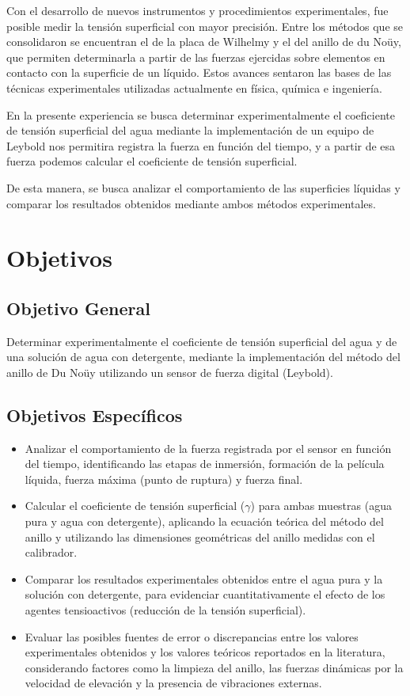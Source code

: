 \documentclass[11pt,a4paper]{article}
\begin{document}
Con el desarrollo de nuevos instrumentos y procedimientos experimentales, 
fue posible medir la tensión superficial con mayor precisión. Entre los 
métodos que se consolidaron se encuentran el de la placa de Wilhelmy y 
el del anillo de du Noüy, que permiten determinarla a partir de las 
fuerzas ejercidas sobre elementos en contacto con la superficie de un 
líquido. Estos avances sentaron las bases de las técnicas experimentales 
utilizadas actualmente en física, química e ingeniería.

En la presente experiencia se busca determinar
experimentalmente el coeficiente de tensión superficial
del agua mediante la implementación de un equipo de Leybold
nos permitira registra la fuerza en función del tiempo, 
y a partir de esa fuerza podemos calcular el coeficiente 
de tensión superficial.

De esta manera, se busca analizar el comportamiento
de las superficies líquidas y comparar los resultados
obtenidos mediante ambos métodos experimentales.

\newpage
\section{Objetivos}

\subsection*{Objetivo General}
Determinar experimentalmente el coeficiente de tensión superficial del agua y de una solución de agua con detergente, mediante la implementación del método del anillo de Du Noüy utilizando un sensor de fuerza digital (Leybold).

\subsection*{Objetivos Específicos}
\begin{itemize}
    \item Analizar el comportamiento de la fuerza registrada por el sensor en función del tiempo, identificando las etapas de inmersión, formación de la película líquida, fuerza máxima (punto de ruptura) y fuerza final.
    \item Calcular el coeficiente de tensión superficial (\(\gamma\)) para ambas muestras (agua pura y agua con detergente), aplicando la ecuación teórica del método del anillo y utilizando las dimensiones geométricas del anillo medidas con el calibrador.
    \item Comparar los resultados experimentales obtenidos entre el agua pura y la solución con detergente, para evidenciar cuantitativamente el efecto de los agentes tensioactivos (reducción de la tensión superficial).
    \item Evaluar las posibles fuentes de error o discrepancias entre los valores experimentales obtenidos y los valores teóricos reportados en la literatura, considerando factores como la limpieza del anillo, las fuerzas dinámicas por la velocidad de elevación y la presencia de vibraciones externas.
\end{itemize}
\end{document}
